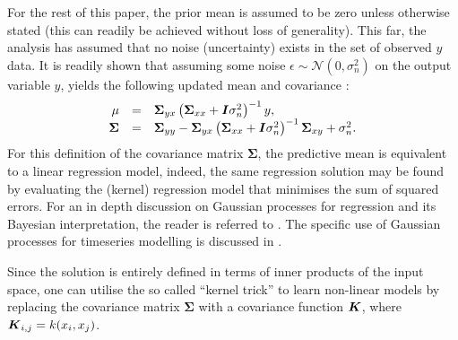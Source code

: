 \documentclass[useAMS,usenatbib,fleqn]{mn2e}
\begin{document}
For the rest of this paper, the prior mean is assumed to be zero unless otherwise stated (this can readily be achieved without loss of generality). This far, the analysis has assumed that no noise (uncertainty) exists in the set of observed $y$ data. It is readily shown that assuming some noise $\epsilon \sim \mathcal{N}\left(0,\sigma_{n}^{2}\right)$ on the output variable $y$, yields the following updated mean and covariance \citep{rasmussen2006gaussian}:
\begin{equation}
\label{eq-mean-variance-noise}
\begin{array}{rcl}
\mu &=& \mathbf\Sigma_{yx}\left(\mathbf\Sigma_{xx}+\bmath{I}\sigma_{n}^{2}\right)^{-1}y,\\
\mathbf\Sigma &=& \mathbf\Sigma_{yy}-\mathbf\Sigma_{yx}\left(\mathbf\Sigma_{xx}+\bmath{I}\sigma_{n}^{2}\right)^{-1}\mathbf\Sigma_{xy}+\sigma_{n}^{2}.
\end{array}
\end{equation}
For this definition of the covariance matrix $\mathbf\Sigma$, the predictive mean is equivalent to a linear regression model, indeed, the same regression solution may be found by evaluating the (kernel) regression model that minimises the sum of squared errors. For an in depth discussion on Gaussian processes for regression and its Bayesian interpretation, the reader is referred to \citep{rasmussen2006gaussian}. The specific use of Gaussian processes for timeseries modelling is discussed in \citep{roberts2012rs}.

Since the solution is entirely defined in terms of inner products of the input space, one can utilise the so called ``kernel trick'' to learn non-linear models by replacing the covariance matrix $\mathbf\Sigma$ with a covariance function $\bmath{K}$, where $\bmath{K}_{i,j} = k(x_{i},x_{j})$.
\end{document}
